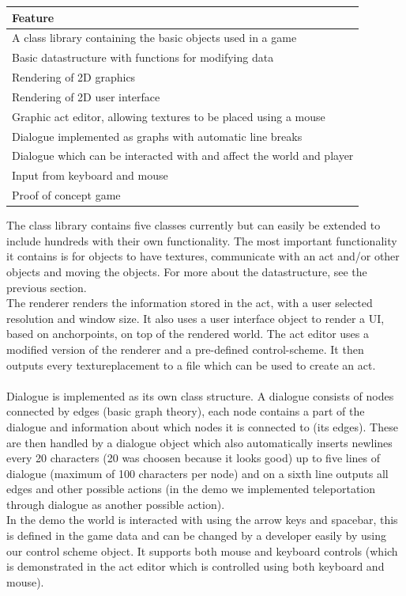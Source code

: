 \documentclass[12pt,a4paper]{article}
\begin{document}
\bigskip

\begin{tabular}{|l|}
\hline
\textbf{Feature}\\ \hline
A class library containing the basic objects used in a game \\ \hline
Basic datastructure with functions for modifying data \\ \hline
Rendering of 2D graphics \\ \hline
Rendering of 2D user interface \\ \hline
Graphic act editor, allowing textures to be placed using a mouse \\ \hline
Dialogue implemented as graphs with automatic line breaks \\ \hline
Dialogue which can be interacted with and affect the world and player \\ \hline
Input from keyboard and mouse \\ \hline
Proof of concept game \\ \hline
\end{tabular}

\bigskip

The class library contains five classes currently but can easily be extended to include hundreds with their own functionality.
The most important functionality it contains is for objects to have textures, communicate with an act and/or other objects and moving the objects.
For more about the datastructure, see the previous section. \\
The renderer renders the information stored in the act, with a user selected resolution and window size. It also uses a user interface object to render a UI, based on anchorpoints, on top of the rendered world.
The act editor uses a modified version of the renderer and a pre-defined control-scheme. It then outputs every textureplacement to a file which can be used to create an act. \\ \\
Dialogue is implemented as its own class structure. A dialogue consists of nodes connected by edges (basic graph theory), each node contains a part of the dialogue and information about which nodes it is connected to (its edges).
These are then handled by a dialogue object which also automatically inserts newlines every 20 characters (20 was choosen because it looks good) up to five lines of dialogue (maximum of 100 characters per node) and on a sixth line outputs all edges and other possible actions (in the demo we implemented teleportation through dialogue as another possible action). \\
In the demo the world is interacted with using the arrow keys and spacebar, this is defined in the game data and can be changed by a developer easily by using our control scheme object. It supports both mouse and keyboard controls (which is demonstrated in the act editor which is controlled using both keyboard and mouse). \\
\end{document}
